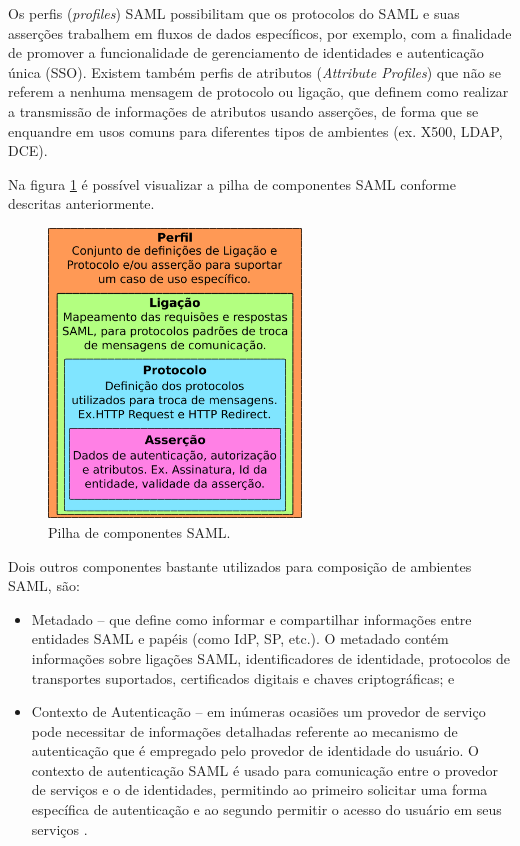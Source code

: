 Os perfis (\textit{profiles}) SAML possibilitam que os protocolos do SAML e suas asserções trabalhem em fluxos de dados específicos, por exemplo, com a finalidade de promover a funcionalidade de gerenciamento de identidades e autenticação única (SSO). Existem também perfis de atributos (\textit{Attribute Profiles}) que não se referem a nenhuma mensagem de protocolo ou ligação, que definem como realizar a transmissão de informações de atributos usando asserções, de forma que se enquandre em usos comuns para diferentes tipos de ambientes (ex. X500, LDAP, DCE).

Na figura \ref{fig_2} é possível visualizar a pilha de componentes SAML conforme descritas anteriormente.

\begin{figure}[!ht]
 \centering
 \includegraphics[width=0.6\textwidth]{figuras/pilha-saml.png}
 \caption{Pilha de componentes SAML.}
 \label{fig_2}
\end{figure}

Dois outros componentes bastante utilizados para composição de ambientes SAML, são:

\begin{itemize}
 \item Metadado -- que define como informar e compartilhar informações entre entidades SAML e papéis (como IdP, SP, etc.). O metadado contém informações sobre ligações SAML, identificadores de identidade, protocolos de transportes suportados, certificados digitais e chaves criptográficas; e
 \item Contexto de Autenticação -- em inúmeras ocasiões um provedor de serviço pode necessitar de informações detalhadas referente ao mecanismo de autenticação que é empregado pelo provedor de identidade do usuário. O contexto de autenticação SAML é usado para comunicação entre o provedor de serviços e o de identidades, permitindo ao primeiro solicitar uma forma específica de autenticação e ao segundo permitir o acesso do usuário em seus serviços \cite{oasis:08}.
\end{itemize}

